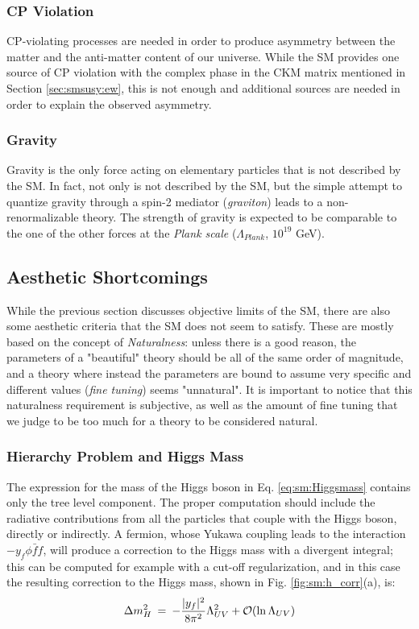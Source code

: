 \subsubsection*{CP Violation}

CP-violating processes are needed in order to produce asymmetry between the matter and the anti-matter content of our universe. While the SM provides one source of CP violation with the complex phase in the CKM matrix mentioned in Section \ref{sec:smsusy:ew}, this is not enough and additional sources are needed in order to explain the observed asymmetry.

\subsubsection*{Gravity}

Gravity is the only force acting on elementary particles that is not described by the SM. In fact, not only is not described by the SM, but the simple attempt to quantize gravity through a spin-2  mediator (\textit{graviton}) leads to a non-renormalizable theory. The strength of gravity is expected to be comparable to the one of the other forces at the \textit{Plank scale} ($\Lambda_{Plank}$, $10^{19}$ GeV). 

\subsection{Aesthetic Shortcomings}
\label{sec:sm:aesthetics}

While the previous section discusses objective limits of the SM, there are also some aesthetic criteria that the SM does not seem to satisfy. These are mostly based on the concept of \textit{Naturalness}: unless there is a good reason, the parameters of a "beautiful" theory should be all of the same order of magnitude, and a theory where instead the parameters are bound to assume very specific and different values (\textit{fine tuning}) seems "unnatural". It is important to notice that this naturalness requirement is subjective, as well as the amount of fine tuning that we judge to be too much for a theory to be considered natural.


\subsubsection*{Hierarchy Problem and Higgs Mass}

The expression for the mass of the Higgs boson in Eq. \ref{eq:sm:Higgsmass} contains only the tree level component. The proper computation should include the radiative contributions from all the particles that couple with the Higgs boson, directly or indirectly. A fermion, whose Yukawa coupling leads to the interaction $-y_f \phi \bar{f} f$, will produce a correction to the Higgs mass with a divergent integral; this can be computed for example with a cut-off regularization, and in this case the resulting correction to the Higgs mass, shown in Fig. \ref{fig:sm:h_corr}(a), is:
\begin{equation}
\Delta m_H^2 \>=\>  
-{|y_f|^2\over 8 \pi^2} \Lambda_{UV}^2 + \mathcal{O}(\ln \Lambda_{UV} )
\label{eq:divhf}
\end{equation}

